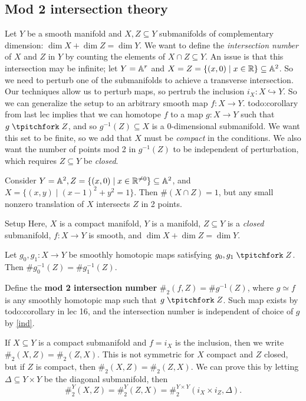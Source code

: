 \subsection{Mod 2 intersection theory}
Let $Y$ be a smooth manifold and $X,Z \subseteq Y$ submanifolds of complementary dimension: $\dim X+\dim Z=\dim Y$. We want to define the \emph{intersection number} of $X$ and $Z$ in $Y$ by counting the elements of $X \cap Z \subseteq Y$. An issue is that this intersection may be infinite; let $Y=\mathbb{A}^r$ and $X=Z=\{(x,0)\mid  x \in \mathbb{R}\} \subseteq \mathbb{A}^2$. So we need to perturb one of the submanifolds to achieve a transverse intersection. Our techniques allow us to perturb maps, so pertrub the inclusion $i_X \colon X \hookrightarrow Y$. So we can generalize the setup to an arbitrary smooth map $f \colon X \to Y$. {\color{red}todo:corollary from last lec} implies that we can homotope $f$ to a map $g \colon X \to Y$ such that $g \transv Z$, and so $g^{-1}(Z)\subseteq X$ is a $0$-dimensional submanifold. We want this set to be finite, so we add that $X$ must be \emph{compact} in the conditions. We also want the number of points mod 2 in $g^{-1}(Z)$ to be independent of perturbation, which requires $Z \subseteq Y$ be \emph{closed}.
\begin{example}
    Consider $Y=\mathbb{A}^2,Z=\{(x,0)\mid x \in \mathbb{R}^{\neq 0}\} \subseteq \mathbb{A}^2$, and $X=\{(x,y)\mid (x-1)^2+y^2=1\} $. Then $\#(X \cap Z)=1$, but any small nonzero translation of $X$ intersects $Z$ in 2 points.
\end{example}
\begin{namedthing}{Setup} 
   Here, $X$ is a compact manifold, $Y$ is a manifold, $Z \subseteq Y$ is a \emph{closed} submanifold, $f \colon X \to Y$ is smooth, and $\dim X+\dim Z=\dim Y$. 
\end{namedthing}
\begin{lemma}\label{ind} 
    Let $g_0,g_1 \colon X \to Y$ be smoothly homotopic maps satisfying $g_0,g_1\transv Z$. Then $\#g_0^{-1}(Z)=\#g_1^{-1}(Z)$. 
\end{lemma}
\begin{definition}[]
    Define the \textbf{mod 2 intersection number} $\#_2(f,Z)=\#g^{-1}(Z)$, where $g \simeq f$ is any smoothly homotopic map such that $g \transv Z$. Such map exists by {\color{red}todo:corollary in lec 16}, and the intersection number is independent of choice of $g$ by \cref{ind}.
\end{definition}
\begin{remark}
    If $X \subseteq Y$ is a compact submanifold and $f=i_X$ is the inclusion, then we write $\#_2(X,Z)=\#_2(Z,X)$. This is not symmetric for $X$ compact and $Z$ closed, but if $Z$ is compact, then $\#_2(X,Z)=\#_2(Z,X)$. We can prove this by letting $\Delta \subseteq Y\times Y$ be the diagonal submanifold, then \[
        \#^Y_2(X,Z)=\#_2^Y(Z,X)=\#_2 ^{Y\times Y}(i_X \times i_Z,\Delta).
    \] 
\end{remark}
